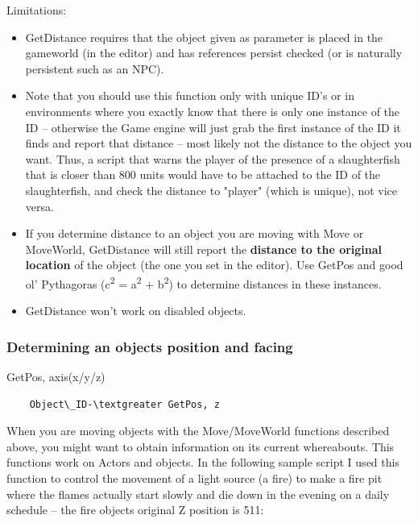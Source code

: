 Limitations:

\begin{itemize}
\item
  GetDistance requires that the object given as parameter is placed in
  the gameworld (in the editor) and has references persist checked (or
  is naturally persistent such as an NPC).
\item
  Note that you should use this function only with unique ID's or in
  environments where you exactly know that there is only one instance of
  the ID -- otherwise the Game engine will just grab the first instance
  of the ID it finds and report that distance -- most likely not the
  distance to the object you want. Thus, a script that warns the player
  of the presence of a slaughterfish that is closer than 800 units would
  have to be attached to the ID of the slaughterfish, and check the
  distance to "player" (which is unique), not vice versa.
\item
  If you determine distance to an object you are moving with Move or
  MoveWorld, GetDistance will still report the \textbf{distance to the
  original location} of the object (the one you set in the editor). Use
  GetPos and good ol' Pythagoras (c\textsuperscript{2} =
  a\textsuperscript{2} + b\textsuperscript{2}) to determine distances in
  these instances.
\item
  GetDistance won't work on disabled objects.
\end{itemize}

\hypertarget{determining-an-objects-position-and-facing}{%
\subsubsection{Determining an objects position and
facing}\label{determining-an-objects-position-and-facing}}

GetPos, axis(x/y/z)

\begin{lstlisting}
	Object\_ID-\textgreater GetPos, z
\end{lstlisting}

When you are moving objects with the Move/MoveWorld functions described
above, you might want to obtain information on its current whereabouts.
This functions work on Actors and objects. In the following sample
script I used this function to control the movement of a light source (a
fire) to make a fire pit where the flames actually start slowly and die
down in the evening on a daily schedule -- the fire objects original Z
position is 511:

